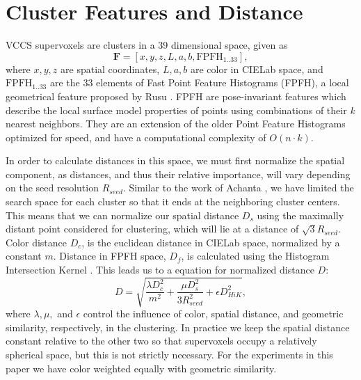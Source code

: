 \section{Cluster Features and Distance}
\label{subsec:Features}
VCCS supervoxels are clusters in a 39 dimensional space, given as 
\begin{equation}
\label{eqn:FeatureSpace}
\mathbf{F} = [x,y,z,L,a,b,\textrm{FPFH}_{1..33}],
\end{equation}
where $x,y,z$ are spatial coordinates, $L,a,b$ are color in CIELab space, and $\textrm{FPFH}_{1..33}$ are the 33 elements of Fast Point Feature Histograms (FPFH), a local geometrical feature proposed by Rusu  \cite{FPFH}. FPFH are pose-invariant features which describe the local surface model properties of points using combinations of their \textit{k} nearest neighbors. They are an extension of the older Point Feature Histograms optimized for speed, and have a computational complexity of $O(n \cdot k)$.  

In order to calculate distances in this space, we must first normalize the spatial component, as distances, and thus their relative importance, will vary depending on the seed resolution ${R}_{seed}$. Similar to the work of Achanta , \cite{SLICCompared} we have limited the search space for each cluster so that it ends at the neighboring cluster centers. This means that we can normalize our spatial distance $D_s$ using the maximally distant point considered for clustering, which will lie at a distance of $\sqrt{3} {R}_{seed}$. Color distance $D_c$, is the euclidean distance in CIELab space, normalized by a constant $m$. Distance in FPFH space, $D_f$, is calculated using the Histogram Intersection Kernel \cite{HistogramIntersection}. This leads us to a equation for normalized distance $D$:
\begin{equation}
\label{eqn:Distance}
D = \sqrt{\frac{\lambda D_c^2}{m^2}+\frac{\mu D_s^2}{3 {R}_{seed}^{2}}+\epsilon {D}_{HiK}^{2}},
\end{equation}
where $\lambda,\mu,$ and $\epsilon$ control the influence of color, spatial distance, and geometric similarity, respectively, in the clustering. In practice we keep the spatial distance constant relative to the other two so that supervoxels occupy a relatively spherical space, but this is not strictly necessary. For the experiments in this paper we have color weighted equally with geometric similarity.

